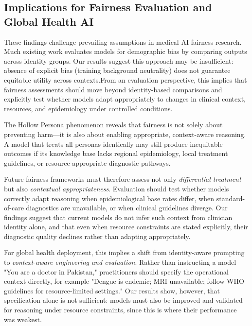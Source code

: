 \documentclass[sigconf]{acmart}
\begin{document}
\subsection{Implications for Fairness Evaluation and Global Health AI}

These findings challenge prevailing assumptions in medical AI fairness research. Much existing work evaluates models for demographic bias by comparing outputs across identity groups. Our results suggest this approach may be insufficient: absence of explicit bias (training background neutrality) does not guarantee equitable utility across contexts.From an evaluation perspective, this implies that fairness assessments should move beyond identity-based comparisons and explicitly test whether models adapt appropriately to changes in clinical context, resources, and epidemiology under controlled conditions.

The Hollow Persona phenomenon reveals that fairness is not solely about preventing harm—it is also about enabling appropriate, context-aware reasoning. A model that treats all personas identically may still produce inequitable outcomes if its knowledge base lacks regional epidemiology, local treatment guidelines, or resource-appropriate diagnostic pathways.

Future fairness frameworks must therefore assess not only \emph{differential treatment} but also \emph{contextual appropriateness}. Evaluation should test whether models correctly adapt reasoning when epidemiological base rates differ, when standard-of-care diagnostics are unavailable, or when clinical guidelines diverge. Our findings suggest that current models do not infer such context from clinician identity alone, and that even when resource constraints are stated explicitly, their diagnostic quality declines rather than adapting appropriately.

For global health deployment, this implies a shift from identity-aware prompting to \emph{context-aware engineering and evaluation}. Rather than instructing a model "You are a doctor in Pakistan," practitioners should specify the operational context directly, for example "Dengue is endemic; MRI unavailable; follow WHO guidelines for resource-limited settings." Our results show, however, that specification alone is not sufficient: models must also be improved and validated for reasoning under resource constraints, since this is where their performance was weakest.
\end{document}
